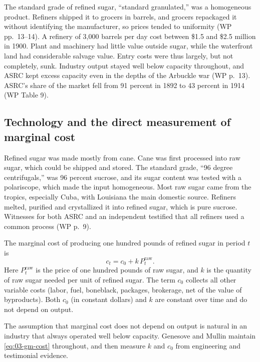 The standard grade of refined sugar, ``standard granulated,'' was a homogeneous product. Refiners shipped it
to grocers in barrels, and grocers repackaged it without identifying the manufacturer, so prices tended to
uniformity (WP pp.~13--14). A refinery of 3,000 barrels per day cost between \$1.5 and \$2.5 million in 1900.
Plant and machinery had little value outside sugar, while the waterfront land had considerable salvage value.
Entry costs were thus largely, but not completely, sunk. Industry output stayed well below capacity
throughout, and ASRC kept excess capacity even in the depths of the Arbuckle war (WP p.~13). ASRC's share
of the market fell from 91 percent in 1892 to 43 percent in 1914 (WP Table 9).

\subsection{Technology and the direct measurement of marginal cost}\label{sec:03-sugar-cost}

Refined sugar was made mostly from cane. Cane was first processed into raw sugar, which could be shipped
and stored. The standard grade, ``96 degree centrifugals,'' was 96 percent sucrose, and its sugar content
was tested with a polariscope, which made the input homogeneous. Most raw sugar came from the tropics,
especially Cuba, with Louisiana the main domestic source. Refiners melted, purified and crystallized it
into refined sugar, which is pure sucrose. Witnesses for both ASRC and an independent testified that all
refiners used a common process (WP p.~9).

\begin{assumption}\label{ass:03-gm-cost}
The marginal cost of producing one hundred pounds of refined sugar in period $t$ is
\begin{equation}\label{eq:03-gm-cost}
c_t = c_0 + k\,P^{\mathrm{raw}}_t .
\end{equation}
Here $P^{\mathrm{raw}}_t$ is the price of one hundred pounds of raw sugar, and $k$ is the quantity of raw sugar
needed per unit of refined sugar. The term $c_0$ collects all other variable costs (labor, fuel, boneblack,
packages, brokerage, net of the value of byproducts). Both $c_0$ (in constant dollars) and $k$ are constant
over time and do not depend on output.
\end{assumption}

The assumption that marginal cost does not depend on output is natural in an industry that always operated
well below capacity. Genesove and Mullin maintain \eqref{eq:03-gm-cost} throughout, and then measure $k$ and
$c_0$ from engineering and testimonial evidence.


